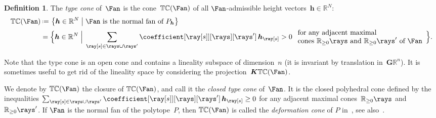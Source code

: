 \documentclass{amsart}
\theoremstyle{definition}
\newtheorem{definition}[theorem]{Definition}
\newcommand{\R}{\mathbb{R}} %
\renewcommand{\b}[1]{{\boldsymbol{#1}}} %
\newcommand{\set}[2]{\left\{ #1 \;\middle|\; #2 \right\}} %
\newcommand{\Bigset}[2]{\Big\{ #1 \;\Big|\; #2 \Big\}} %
\newcommand{\eqdef}{\mbox{\,\raisebox{0.2ex}{\scriptsize\ensuremath{\mathrm:}}\ensuremath{=}\,}} %
\newcommand{\darkblue}{\color{darkblue}} %
\newcommand{\defn}[1]{\textsl{\darkblue #1}} %
\newcommand{\typeCone}{\mathbb{TC}} %
\newcommand{\ctypeCone}{\smash{\overline{\mathbb{TC}}}} %
\begin{document}
\begin{definition}
\label{def:typeCone}
The \defn{type cone} of~$\Fan$ is the cone~$\typeCone(\Fan)$ of all $\Fan$-admissible height vectors~$\b{h} \in \R^N$:
\begin{align*}
\typeCone(\Fan) & \eqdef \set{\b{h} \in \R^N}{\Fan \text{ is the normal fan of } P_\b{h}} \\
& = \Bigset{\b{h} \in \R^N}{\sum_{\ray[s] \in \rays \cup \rays'} \coefficient[{\ray[s]}][\rays][\rays'] \, \b{h}_{\ray[s]} > 0 \; \begin{array}{l} \text{for any adjacent maximal} \\ \text{cones~$\R_{\ge0}\rays$ and~$\R_{\ge0}\rays'$ of~$\Fan$} \end{array}}.
\end{align*}
\end{definition}

Note that the type cone is an open cone and contains a lineality subspace of dimension~$n$ (it is invariant by translation in~$\b{G} \R^n$). 
It is sometimes useful to get rid of the lineality space by considering the projection~$\b{K}\typeCone(\Fan)$. 

We denote by $\ctypeCone(\Fan)$ the closure of $\typeCone(\Fan)$, and call it the \defn{closed type cone} of~$\Fan$. It is the closed polyhedral cone defined by the inequalities $\sum_{\ray[s] \in \rays \cup \rays'} \coefficient[{\ray[s]}][\rays][\rays'] \, \b{h}_{\ray[s]} \ge 0$ for any adjacent maximal cones~$\R_{\ge0}\rays$ and~$\R_{\ge0}\rays'$. If $\Fan$ is the normal fan of the polytope~$P$, then $\ctypeCone(\Fan)$ is called the \defn{deformation cone} of $P$ in~\cite{Postnikov}, see also~\cite{PostnikovReinerWilliams}.
\end{document}
